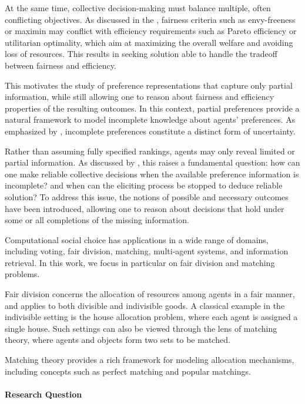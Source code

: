 \documentclass{article}
\begin{document}
At the same time, collective decision-making must balance multiple, often conflicting objectives. 
As discussed in the \citep[Chapter 12]{brandt2016handbook}, fairness criteria such as envy-freeness or maximin may conflict with efficiency requirements such as Pareto efficiency or utilitarian optimality, which aim at maximizing the overall welfare and avoiding loss of resources. 
This results in seeking solution able to handle the tradeoff between fairness and efficiency.

This motivates the study of preference representations that capture only partial information, while still allowing one to reason about fairness and efficiency properties of the resulting outcomes.
In this context, partial preferences provide a natural framework to model incomplete knowledge about agents' preferences. 
As emphasized by \cite{kenig2019approximate}, incomplete preferences constitute a distinct form of uncertainty.

Rather than assuming fully specified rankings, agents may only reveal limited or partial information. 
As discussed by \cite{lang2020collective}, this raises a fundamental question: how can one make reliable collective decisions when the available preference information is incomplete? and when can the eliciting process be stopped to deduce reliable solution?
To address this issue, the notions of possible and necessary outcomes have been introduced, allowing one to reason about decisions that hold under some or all completions of the missing information.

Computational social choice has applications in a wide range of domains, including voting, fair division, matching, multi-agent systems, and information retrieval. 
In this work, we focus in particular on fair division and matching problems.

Fair division concerns the allocation of resources among agents in a fair manner, and applies to both divisible and indivisible goods. 
A classical example in the indivisible setting is the house allocation problem, where each agent is assigned a single house. 
Such settings can also be viewed through the lens of matching theory, where agents and objects form two sets to be matched.

Matching theory provides a rich framework for modeling allocation mechanisms, including concepts such as perfect matching and popular matchings. 

\paragraph{Research Question}
\end{document}
